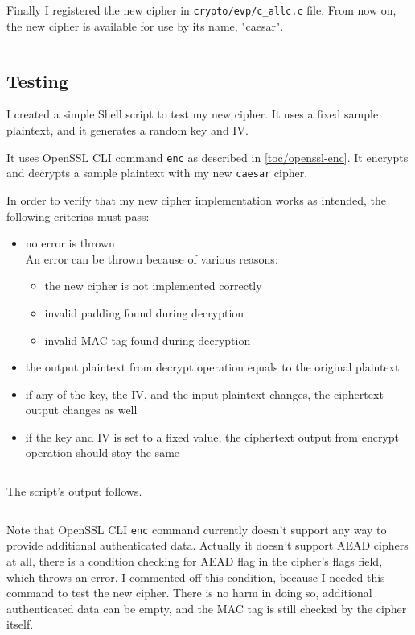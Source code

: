 \inputminted{c}{code/openssl/crypto/evp/caesar/e_caesar_ctrl.c}

Finally I registered the new cipher in \texttt{crypto/evp/c\_allc.c} file. From now on, the new cipher is available for use by its name, "caesar".

\inputminted{c}{code/openssl/crypto/evp/c_allc.c}

\subsection{Testing}

I created a simple Shell script to test my new cipher. It uses a fixed sample plaintext, and it generates a random key and IV.

It uses OpenSSL CLI command \texttt{enc} as described in \autoref{toc/openssl-enc}. It encrypts and decrypts a sample plaintext with my new \texttt{caesar} cipher.

In order to verify that my new cipher implementation works as intended, the following criterias must pass:

\begin{itemize}
  \item no error is thrown \\ An error can be thrown because of various reasons:
  \begin{itemize}
    \item the new cipher is not implemented correctly
    \item invalid padding found during decryption
    \item invalid MAC tag found during decryption
  \end{itemize}
  \item the output plaintext from decrypt operation equals to the original plaintext
  \item if any of the key, the IV, and the input plaintext changes, the ciphertext output changes as well
  \item if the key and IV is set to a fixed value, the ciphertext output from encrypt operation should stay the same
\end{itemize}

\inputminted{bash}{code/test-enc.sh}

The script's output follows.

\inputminted{text}{code/test-enc.sh.out}

Note that OpenSSL CLI \texttt{enc} command currently doesn't support any way to provide additional authenticated data. Actually it doesn't support AEAD ciphers at all, there is a condition checking for AEAD flag in the cipher's flags field, which throws an error. I commented off this condition, because I needed this command to test the new cipher. There is no harm in doing so, additional authenticated data can be empty, and the MAC tag is still checked by the cipher itself.

